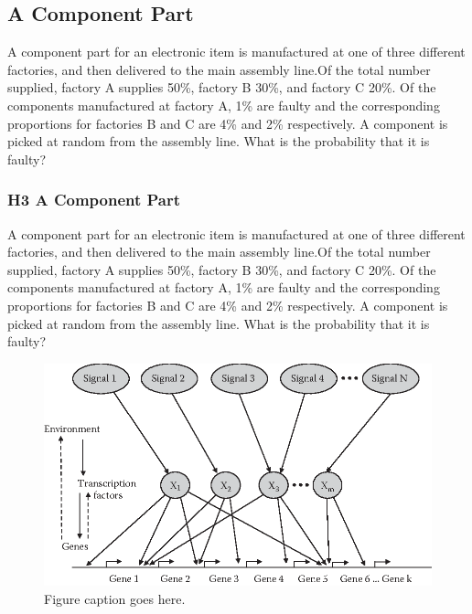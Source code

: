 \subsection{A Component Part}
A component part for an electronic item is
manufactured at one of three different factories, and then delivered to
the main assembly line.Of the total number supplied, factory A supplies
50\%, factory B 30\%, and factory C 20\%. Of the components
manufactured at factory A, 1\% are faulty and the corresponding
proportions for factories B and C are 4\% and 2\% respectively. A
component is picked at random from the assembly line. What is the
probability that it is faulty? 








\subsubsection{H3 A Component Part }
A component part for an electronic item is
manufactured at one of three \cite{mardia1979ma} different factories, and then delivered to
the main assembly line.Of the total number supplied, factory A supplies
50\%, factory B 30\%, and factory C 20\%. Of the components
manufactured at factory A, 1\% are faulty and the corresponding
proportions for factories B and C are 4\% and 2\% respectively. A
component is picked at random from the assembly line. What is the
probability that it is faulty? 


\begin{figure}\centering
\includegraphics[width=\textwidth]{chapters/my-chapter/figures/002x001.eps}
\caption[List of figure caption goes here]{Figure caption goes here.}
\end{figure}

